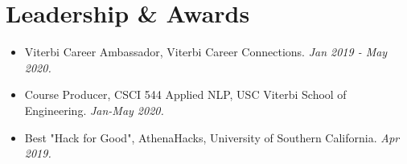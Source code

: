 \documentclass[letterpaper,10pt]{article}
\newcommand{\activity}[2]{
    \item #1 \emph{#2}
}
\newcommand{\bulletsBegin}{
    \vspace{1pt}
    \begin{minipage}{17.6cm}
    \begin{itemize}[leftmargin=0.6cm]
    \setlength\itemsep{-0.1em}
}
\newcommand{\bulletsEnd}{
    \end{itemize}\vspace{0pt}
    \end{minipage}
}
\begin{document}
    
    \section{Leadership \& Awards}

    \bulletsBegin
        \activity{Viterbi Career Ambassador, Viterbi Career Connections.}
        {Jan 2019 - May 2020.}
        \vspace{-3pt}
        \activity{Course Producer, CSCI 544 Applied NLP, USC Viterbi School of Engineering.}
        {Jan-May 2020.}
        \vspace{-3pt}
        \activity{Best "Hack for Good", AthenaHacks, University of Southern California.}
        {Apr 2019.}
        \vspace{-2pt}
    \bulletsEnd

\end{document}
